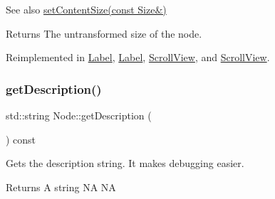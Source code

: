 \begin{DoxySeeAlso}{See also}
{\ttfamily \hyperlink{classNode_ade113d7fc9244f58ac98a4712da49818}{set\+Content\+Size(const Size\&)}}
\end{DoxySeeAlso}
\begin{DoxyReturn}{Returns}
The untransformed size of the node. 
\end{DoxyReturn}


Reimplemented in \hyperlink{classLabel_a6ff9d78705856ffaf4b5258682e1df00}{Label}, \hyperlink{classLabel_a3b571f804249bde9c8d8a5b4bb067d3f}{Label}, \hyperlink{classScrollView_a996456628c049a6cc2876a7b18d15648}{Scroll\+View}, and \hyperlink{classScrollView_a137f08e58505c253a4c3274c426200b2}{Scroll\+View}.

\mbox{\label{classNode_a41710375a0d92a4ee54c39fe123b5912}} 
\subsubsection{\texorpdfstring{get\+Description()}{getDescription()}\hspace{0.1cm}{\footnotesize\ttfamily [1/2]}}
{\footnotesize\ttfamily std\+::string Node\+::get\+Description (\begin{DoxyParamCaption}{ }\end{DoxyParamCaption}) const\hspace{0.3cm}{\ttfamily [virtual]}}

Gets the description string. It makes debugging easier. \begin{DoxyReturn}{Returns}
A string  NA  NA 
\end{DoxyReturn}


